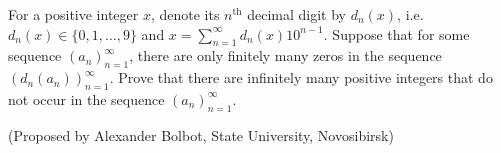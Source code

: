 For a positive integer $x$, denote its $n^{\mathrm{th}}$ decimal digit by $d_n(x)$, i.e. $d_n(x)\in \{ 0,1, \dots, 9\}$ and $x=\sum_{n=1}^{\infty} d_n(x)10^{n-1}$. Suppose that for some sequence $(a_n)_{n=1}^{\infty}$, there are only finitely many zeros in the sequence $(d_n(a_n))_{n=1}^{\infty}$. Prove that there are infinitely many positive integers that do not occur in the sequence $(a_n)_{n=1}^{\infty}$.

(Proposed by Alexander Bolbot, State University, Novosibirsk)